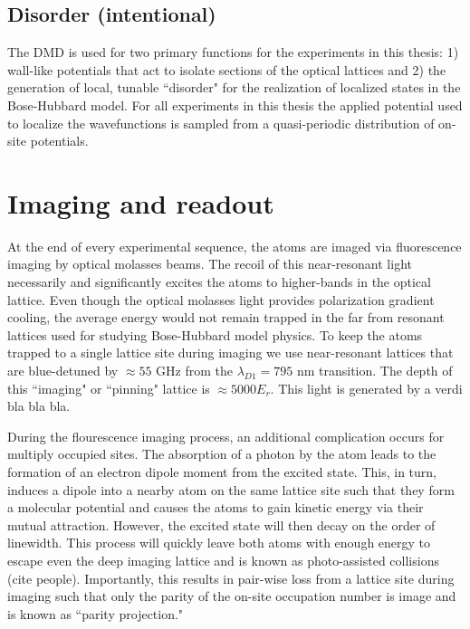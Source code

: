 \subsection{Disorder (intentional)}

The DMD is used for two primary functions for the experiments in this thesis: 1) wall-like potentials that act to isolate sections of the optical lattices and 2) the generation of local, tunable ``disorder" for the realization of localized states in the Bose-Hubbard model. For all experiments in this thesis the applied potential used to localize the wavefunctions is sampled from a quasi-periodic distribution of on-site potentials.  

\section{Imaging and readout}

At the end of every experimental sequence, the atoms are imaged via fluorescence imaging by optical molasses beams. The recoil of this near-resonant light necessarily and significantly excites the atoms to higher-bands in the optical lattice. Even though the optical molasses light provides polarization gradient cooling, the average energy would not remain trapped in the far from resonant lattices used for studying Bose-Hubbard model physics. To keep the atoms trapped to a single lattice site during imaging we use near-resonant lattices that are blue-detuned by $\approx 55$ GHz from the $\lambda_{D1} = 795$ nm transition. The depth of this ``imaging" or ``pinning" lattice is $\approx 5000 E_r$. This light is generated by a verdi bla bla bla. 

During the flourescence imaging process, an additional complication occurs for multiply occupied sites. The absorption of a photon by the atom leads to the formation of an electron dipole moment from the excited state. This, in turn, induces a dipole into a nearby atom on the same lattice site such that they form a molecular potential and causes the atoms to gain kinetic energy via their mutual attraction. However, the excited state will then decay on the order of linewidth. This process will quickly leave both atoms with enough energy to escape even the deep imaging lattice and is known as photo-assisted collisions (cite people). Importantly, this results in pair-wise loss from a lattice site during imaging such that only the parity of the on-site occupation number is image and is known as ``parity projection."

